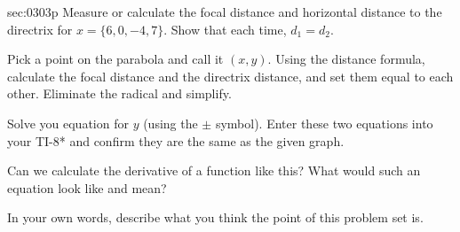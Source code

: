 \begin{multicols*}{2}
\begin{exercises}{sec:0303p}
\lab[] Measure or calculate the focal distance and horizontal distance to the
directrix for $x=\{6,0,-4,7\}$.  Show that each time, $d_1=d_2$.

\vspace{3cm}
\lab[] Pick a point on the parabola and call it $(x,y)$.  Using the distance
formula, calculate the focal distance and the directrix distance, and
set them equal to each other.  Eliminate the radical and simplify.

\vspace{3cm}
\lab[] Solve you equation for $y$ (using the $\pm$ symbol).  Enter these
two equations into your TI-8* and confirm they are the same as the
given graph.

\vspace{0.5cm}
\lab[]  Can we calculate the derivative of a function like this?  What would
such an equation look like and mean?

\vspace{2cm}
\lab[]  In your own words, describe what you think the point of this
problem set is.
\end{exercises}
\end{multicols*}
